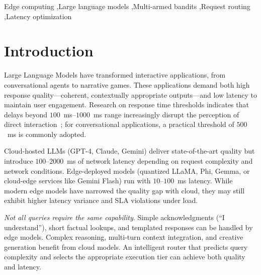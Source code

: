 \documentclass[final,3p,twocolumn,authoryear]{elsarticle}
\newcommand{\rev}[1]{\textcolor{red}{#1}}
\newcommand{\system}{EdgeLLM-Router\xspace}
\theoremstyle{plain}
\theoremstyle{definition}
\begin{document}
\begin{frontmatter}
\begin{abstract}
\rev{On an interactive narrative workload, \system{} reaches $99.2\%$ of cloud-only quality while reducing $p_{99}$ latency by $64\%$ and SLA violations by $99\%$ compared to the cloud-only baseline, with $87\%$ cost savings.
A paired bootstrap test over the $5$-seed main workload shows DATS significantly reduces SLA violations compared with plain Thompson Sampling ($95\%$ CI excludes zero), and a separate network-shift experiment shows the same ordering under non-stationary conditions.
Analysis across nine experimental dimensions---including latency-model sensitivity, multi-domain generalisation, predictor ablation, and statistical robustness---validates the effectiveness of adaptive routing.}
\end{abstract}

\begin{keyword}
Edge computing \sep Large language models \sep Multi-armed bandits \sep Request routing \sep Latency optimization
\end{keyword}

\end{frontmatter}

\section{Introduction}

Large Language Models have transformed interactive applications, from conversational agents to narrative games.
These applications demand both high response quality---coherent, contextually appropriate outputs---and low latency to maintain user engagement.
Research on response time thresholds indicates that delays beyond $100$~ms--$1000$~ms range increasingly disrupt the perception of direct interaction~\citep{nielsen1993response}; for conversational applications, a practical threshold of $500$~ms is commonly adopted.

Cloud-hosted LLMs (GPT-4, Claude, Gemini) deliver state-of-the-art quality but introduce $100$--$2000$~ms of network latency depending on request complexity and network conditions.
Edge-deployed models (quantized LLaMA, Phi, Gemma, or cloud-edge services like Gemini Flash) run with $10$--$100$~ms latency.
While modern edge models have narrowed the quality gap with cloud, they may still exhibit higher latency variance and SLA violations under load.

\emph{Not all queries require the same capability}.
Simple acknowledgments (``I understand''), short factual lookups, and templated responses can be handled by edge models.
Complex reasoning, multi-turn context integration, and creative generation benefit from cloud models.
An intelligent router that predicts query complexity and selects the appropriate execution tier can achieve both quality and latency.
\end{document}
